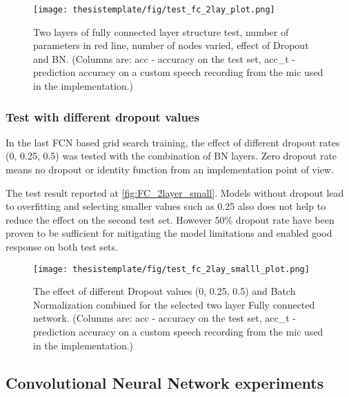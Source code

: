 \begin{figure}[ht!]
  \begin{center}
    \texttt{[image: thesistemplate/fig/test\_fc\_2lay\_plot.png]}
    \caption{Two layers of fully connected layer structure test, number of parameters in red line, number of nodes varied, effect of Dropout and BN. (Columns are: acc - accuracy on the test set, acc\_t - prediction accuracy on a custom speech recording from the mic used in the implementation.)}
    \label{fig:FC_2layer}
  \end{center}
\end{figure}

\subsubsection{Test with different dropout values}

In the last FCN based grid search training, the effect of different dropout rates (0, 0.25, 0.5) was tested with the combination of BN layers. Zero dropout rate means no dropout or identity function from an implementation point of view.

The test result reported at \autoref{fig:FC_2layer_small}. Models without dropout lead to overfitting and selecting smaller values such as 0.25 also does not help to reduce the effect on the second test set. However 50\% dropout rate have been proven to be sufficient for mitigating the model limitations and enabled good response on both test sets.

\begin{figure}[ht!]
  \begin{center}
    \texttt{[image: thesistemplate/fig/test\_fc\_2lay\_smalll\_plot.png]}
    \caption{The effect of different Dropout values (0, 0.25, 0.5) and Batch Normalization combined for the selected two layer Fully connected network.  (Columns are: acc - accuracy on the test set, acc\_t - prediction accuracy on a custom speech recording from the mic used in the implementation.)}
    \label{fig:FC_2layer_small}
  \end{center}
\end{figure}

\newpage
\subsection{Convolutional Neural Network experiments}

